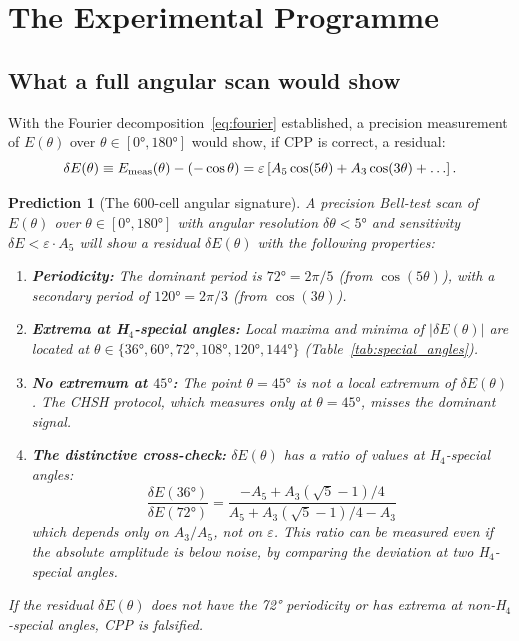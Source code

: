 \documentclass[11pt,a4paper]{article}
\newtheorem{prediction}[theorem]{Prediction}
\newcommand{\eps}{\varepsilon}
\begin{document}
\section{The Experimental Programme}
\label{sec:experiment}

\subsection{What a full angular scan would show}

With the Fourier decomposition~\eqref{eq:fourier} established, a
precision measurement of $E(\theta)$ over $\theta \in [0°, 180°]$
would show, if CPP is correct, a residual:
\begin{equation}
\delta E(\theta) \equiv E_{\rm meas}(\theta) - (-\cos\theta)
= \eps\left[A_5\cos(5\theta) + A_3\cos(3\theta) + \ldots\right].
\label{eq:residual}
\end{equation}

\begin{prediction}[The 600-cell angular signature]
\label{pred:angular}
A precision Bell-test scan of $E(\theta)$ over $\theta \in [0°, 180°]$
with angular resolution $\delta\theta < 5°$ and sensitivity
$\delta E < \eps \cdot A_5$ will show a residual $\delta E(\theta)$
with the following properties:
\begin{enumerate}
\item \textbf{Periodicity:} The dominant period is $72° = 2\pi/5$
  (from $\cos(5\theta)$), with a secondary period of $120° = 2\pi/3$
  (from $\cos(3\theta)$).
\item \textbf{Extrema at H$_4$-special angles:} Local maxima and
  minima of $|\delta E(\theta)|$ are located at
  $\theta \in \{36°, 60°, 72°, 108°, 120°, 144°\}$
  (Table~\ref{tab:special_angles}).
\item \textbf{No extremum at $45°$:} The point $\theta = 45°$ is not
  a local extremum of $\delta E(\theta)$.  The CHSH protocol, which
  measures only at $\theta = 45°$, misses the dominant signal.
\item \textbf{The distinctive cross-check:} $\delta E(\theta)$ has a
  ratio of values at H$_4$-special angles:
  \begin{equation}
  \frac{\delta E(36°)}{\delta E(72°)}
  = \frac{-A_5 + A_3(\sqrt5-1)/4}
         {A_5 + A_3(\sqrt5-1)/4 - A_3}
  \label{eq:ratio_check}
  \end{equation}
  which depends only on $A_3/A_5$, not on $\eps$.  This ratio can
  be measured even if the absolute amplitude is below noise, by
  comparing the deviation at two H$_4$-special angles.
\end{enumerate}
If the residual $\delta E(\theta)$ does \emph{not} have the 72°
periodicity or has extrema at non-H$_4$-special angles, CPP is
falsified.
\end{prediction}
\end{document}
